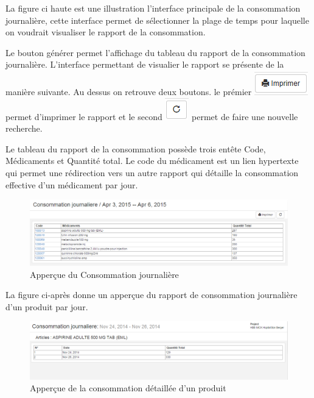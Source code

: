 \documentclass[12pt,a4paper]{report}
\begin{document}
La figure ci haute est une illustration l'interface principale de la consommation journalière, cette interface permet de sélectionner la plage de temps pour laquelle on voudrait visualiser le rapport de la consommation. 

Le bouton générer permet l'affichage du tableau du rapport de la consommation journalière.
L'interface permettant de visualier le rapport se présente de la manière suivante. Au dessus on retrouve deux boutons. le prémier 
\includegraphics[scale=0.7]{pic/Print.png} permet d'imprimer le rapport et le second \includegraphics[scale=0.7]{pic/refresh.png} permet de faire une nouvelle recherche.

Le tableau du rapport de la consommation possède trois entête Code, Médicaments et Quantité total. Le code du médicament est un lien hypertexte qui permet une rédirection vers un autre rapport qui détaille la consommation effective d'un médicament par jour. 

\begin{figure}[h]
\begin{center}
\includegraphics[width=14cm]{pic/ConsoJournProd.png}
\end{center}
\caption{Apperçue du Consommation journalière}
\label{Apperçue du Consommation journalière}
\end{figure}


La figure ci-après donne un apperçue du rapport de consommation journalière d'un produit par jour.

\begin{figure}[h]
\begin{center}
\includegraphics[width=14cm]{pic/ConsoDetJourn.png}
\end{center}
\caption{Apperçue de la consommation détaillée d'un produit}
\label{Apperçue de la consommation détaillée d'un produit}
\end{figure}
\end{document}
